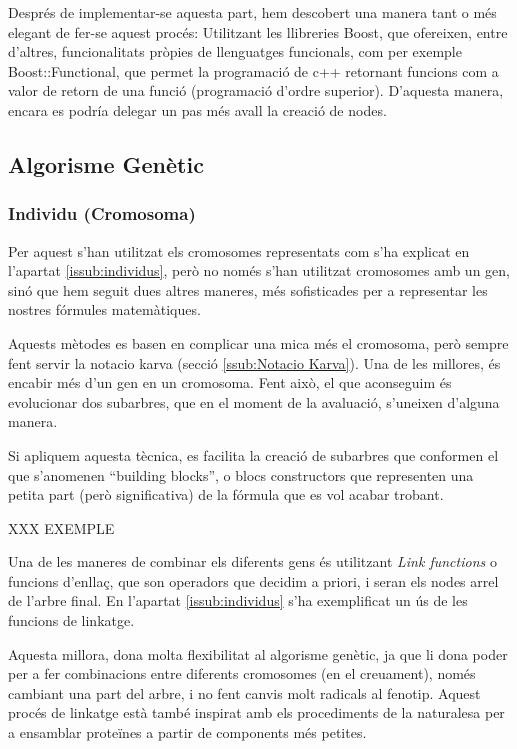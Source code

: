 Després de implementar-se aquesta part, hem descobert una manera tant o més
elegant de fer-se aquest procés:  Utilitzant les llibreries Boost\cite{GABOOST}, que
ofereixen, entre d'altres, funcionalitats pròpies de llenguatges funcionals,
com per exemple Boost::Functional, que permet la programació de c++ retornant
funcions com a valor de retorn de una funció (programació d'ordre superior).  
D'aquesta manera, encara es podría delegar un pas més avall la creació de nodes.



\subsection{Algorisme Genètic} %
\label{ssec:GAlgorisme Genetic}

\subsubsection{Individu (Cromosoma)} %
\label{ssub:Individu (Cromosoma}

Per aquest s'han utilitzat els cromosomes representats com s'ha explicat en
l'apartat \ref{issub:individus}, però no només s'han utilitzat cromosomes amb un
gen, sinó que hem seguit dues altres maneres, més sofisticades per a representar
les nostres fórmules matemàtiques.

Aquests mètodes \cite{ferreira:2006} es basen en complicar una mica més el cromosoma,
però sempre fent servir la notacio karva (secció \ref{ssub:Notacio Karva}).  Una de les millores, és
encabir més d'un gen en un cromosoma. Fent això, el que aconseguim és
evolucionar dos subarbres, que en el moment de la avaluació, s'uneixen d'alguna
manera.

Si apliquem aquesta tècnica, es facilita la creació de subarbres que conformen
el que s'anomenen ``building blocks'', o blocs constructors que representen una
petita part (però significativa) de la fórmula que es vol acabar trobant.

XXX EXEMPLE

Una de les maneres de combinar els diferents gens és utilitzant \emph{Link
functions} o funcions d'enllaç, que son operadors que decidim a priori, i
seran els nodes arrel de l'arbre final.  En l'apartat \ref{issub:individus} s'ha
exemplificat un ús de les funcions de linkatge.

Aquesta millora, dona molta flexibilitat al algorisme genètic, ja que li dona
poder per a fer combinacions entre diferents cromosomes (en el creuament), només
cambiant una part del arbre, i no fent canvis molt radicals al fenotip.  Aquest
procés de linkatge està també inspirat amb els procediments de la naturalesa per
a ensamblar proteïnes a partir de components més petites.

